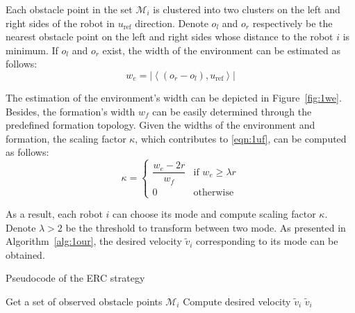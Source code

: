 Each obstacle point in the set $\mathcal{M}_{i}$ is clustered into two clusters on the left and right sides of the robot in $u_\text{ref}$ direction. Denote $o_l$ and $o_r$ respectively be the nearest obstacle point on the left and right sides whose distance to the robot $i$ is minimum. If $o_l$ and $o_r$ exist, the width of the environment can be estimated as follows:
\begin{equation}
    w_e= \left\vert\left\langle\left(o_r-o_l\right),u_\text{ref}\right\rangle\right\vert
    \label{eqn:1we}
\end{equation}

The estimation of the environment's width can be depicted in Figure~\ref{fig:1we}. Besides, the formation's width $w_f$ can be easily determined through the predefined formation topology. Given the widths of the environment and formation, the scaling factor $\kappa$, which contributes to \eqref{eqn:1uf}, can be computed as follows:
\begin{equation}
    \kappa = 
    \begin{cases} 
        \dfrac{w_e - 2r}{w_f} & \text{if } w_e \geq \lambda r \\
        0 & \text{otherwise}
    \end{cases}
    \label{eqn:1kappa}
\end{equation}

As a result, each robot $i$ can choose its mode and compute scaling factor $\kappa$. Denote $\lambda>2$ be the threshold to transform between two mode. As presented in Algorithm~\ref{alg:1our}, the desired velocity $\tilde{v}_i$ corresponding to its mode can be obtained.
\begin{algorithm}[h!]
\caption{Pseudocode of the ERC strategy}
\label{alg:1our}
Get a set of observed obstacle points $\mathcal{M}_i$\;
Compute desired velocity $\tilde{v}_i$
\Return $\tilde{v}_i$\;
\end{algorithm}

